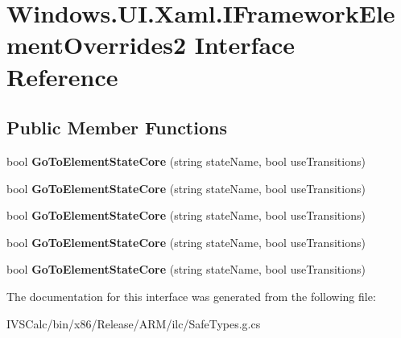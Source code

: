 \hypertarget{interface_windows_1_1_u_i_1_1_xaml_1_1_i_framework_element_overrides2}{}\section{Windows.\+U\+I.\+Xaml.\+I\+Framework\+Element\+Overrides2 Interface Reference}
\label{interface_windows_1_1_u_i_1_1_xaml_1_1_i_framework_element_overrides2}
\subsection*{Public Member Functions}
\begin{DoxyCompactItemize}
\item 
\mbox{\label{interface_windows_1_1_u_i_1_1_xaml_1_1_i_framework_element_overrides2_a82fe8d9bb936c631b508c9ef9cc36117}} 
bool {\bfseries Go\+To\+Element\+State\+Core} (string state\+Name, bool use\+Transitions)
\item 
\mbox{\label{interface_windows_1_1_u_i_1_1_xaml_1_1_i_framework_element_overrides2_a82fe8d9bb936c631b508c9ef9cc36117}} 
bool {\bfseries Go\+To\+Element\+State\+Core} (string state\+Name, bool use\+Transitions)
\item 
\mbox{\label{interface_windows_1_1_u_i_1_1_xaml_1_1_i_framework_element_overrides2_a82fe8d9bb936c631b508c9ef9cc36117}} 
bool {\bfseries Go\+To\+Element\+State\+Core} (string state\+Name, bool use\+Transitions)
\item 
\mbox{\label{interface_windows_1_1_u_i_1_1_xaml_1_1_i_framework_element_overrides2_a82fe8d9bb936c631b508c9ef9cc36117}} 
bool {\bfseries Go\+To\+Element\+State\+Core} (string state\+Name, bool use\+Transitions)
\item 
\mbox{\label{interface_windows_1_1_u_i_1_1_xaml_1_1_i_framework_element_overrides2_a82fe8d9bb936c631b508c9ef9cc36117}} 
bool {\bfseries Go\+To\+Element\+State\+Core} (string state\+Name, bool use\+Transitions)
\end{DoxyCompactItemize}


The documentation for this interface was generated from the following file\+:\begin{DoxyCompactItemize}
\item 
I\+V\+S\+Calc/bin/x86/\+Release/\+A\+R\+M/ilc/Safe\+Types.\+g.\+cs\end{DoxyCompactItemize}
